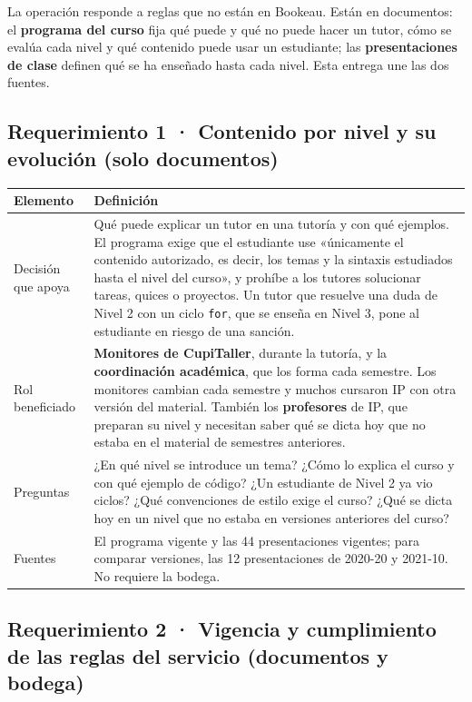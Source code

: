 \documentclass[11pt,letterpaper]{article}
\newcommand{\cod}[1]{\texttt{\small #1}}
\begin{document}
La operación responde a reglas que no están en Bookeau. Están en documentos: el \textbf{programa del curso} fija qué puede y qué no puede hacer un tutor, cómo se evalúa cada nivel y qué contenido puede usar un estudiante; las \textbf{presentaciones de clase} definen qué se ha enseñado hasta cada nivel. Esta entrega une las dos fuentes.

\subsection{Requerimiento 1 · Contenido por nivel y su evolución (solo documentos)}

\begin{table}[H]\small\renewcommand{\arraystretch}{1.2}
\begin{tabularx}{\textwidth}{>{\raggedright\arraybackslash}p{}L}
\toprule
\textbf{Elemento} & \textbf{Definición} \\
\midrule
Decisión que apoya & Qué puede explicar un tutor en una tutoría y con qué ejemplos. El programa exige que el estudiante use «únicamente el contenido autorizado, es decir, los temas y la sintaxis estudiados hasta el nivel del curso», y prohíbe a los tutores solucionar tareas, quices o proyectos. Un tutor que resuelve una duda de Nivel 2 con un ciclo \cod{for}, que se enseña en Nivel 3, pone al estudiante en riesgo de una sanción. \\
Rol beneficiado & \textbf{Monitores de CupiTaller}, durante la tutoría, y la \textbf{coordinación académica}, que los forma cada semestre. Los monitores cambian cada semestre y muchos cursaron IP con otra versión del material. También los \textbf{profesores} de IP, que preparan su nivel y necesitan saber qué se dicta hoy que no estaba en el material de semestres anteriores. \\
Preguntas & ¿En qué nivel se introduce un tema? ¿Cómo lo explica el curso y con qué ejemplo de código? ¿Un estudiante de Nivel 2 ya vio ciclos? ¿Qué convenciones de estilo exige el curso? ¿Qué se dicta hoy en un nivel que no estaba en versiones anteriores del curso? \\
Fuentes & El programa vigente y las 44 presentaciones vigentes; para comparar versiones, las 12 presentaciones de 2020-20 y 2021-10. No requiere la bodega. \\
\bottomrule
\end{tabularx}
\end{table}

\subsection{Requerimiento 2 · Vigencia y cumplimiento de las reglas del servicio (documentos y bodega)}
\end{document}

